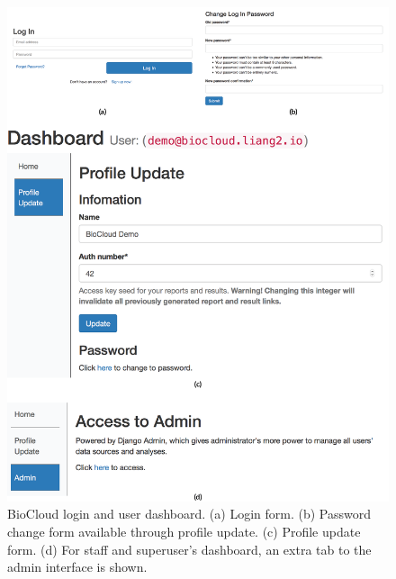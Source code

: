 \begin{figure}[!p]
\centering
\includegraphics[width=1\textwidth]{images/biocloud_dashboard}
\caption[BioCloud login and user dashboard]{
    BioCloud login and user dashboard.
    (a) Login form.
    (b) Password change form available through profile update.
    (c) Profile update form.
    (d) For staff and superuser's dashboard, an extra tab to the admin
    interface is shown.
}
\label{fig:biocloud-dashboard}
\end{figure}

